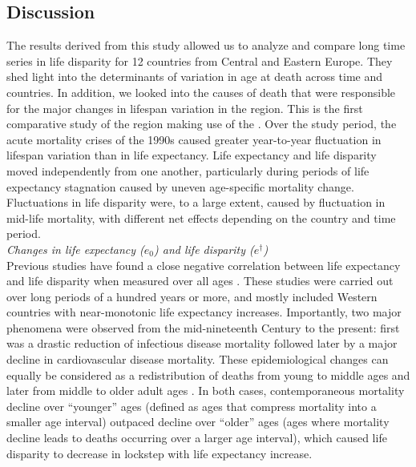 \documentclass{article}
\begin{document}
\begin{spacing}{1.5}
\section*{Discussion}

The results derived from this study allowed us to analyze and compare long time series in life disparity for 12 countries from Central and Eastern Europe. They shed light into the determinants of variation in age at death across time and countries. In addition, \textcolor[rgb]{1,0,0}{we looked into the causes of death that were responsible for the major changes in lifespan variation in the region}. This is the first comparative study of the region making use of the \citet{HcO}. Over the study period, the acute mortality crises of the 1990s caused greater year-to-year fluctuation in lifespan variation than in life expectancy. Life expectancy and life disparity moved independently from one another, particularly during periods of life expectancy stagnation caused by uneven age-specific mortality change. Fluctuations in life disparity were, to a large extent, caused by fluctuation in mid-life mortality, with different net effects depending on the country and time period. \\

 
\emph{Changes in life expectancy ($e_0$) and life disparity ($e^\dagger$)}\\

Previous studies have found a close negative correlation between life expectancy and life disparity when measured over all ages  \citep{ wilmoth1999,vaupel2011,colchero2016emergence}. These studies were carried out over long periods of a hundred years or more, and mostly included Western countries with near-monotonic life expectancy increases. Importantly, two major phenomena were observed from the mid-nineteenth Century to the present: first was a drastic reduction of infectious disease mortality followed later by a major decline in cardiovascular disease mortality. These epidemiological changes can equally be considered as a redistribution of deaths from young to middle ages and later from middle to older adult ages \citep{robine2001redefining}. In both cases, contemporaneous mortality decline over ``younger'' ages (defined as ages that compress mortality into a smaller age interval) outpaced decline over ``older'' ages (ages where mortality decline leads to deaths occurring over a larger age interval), which caused life disparity to decrease in lockstep with life expectancy increase.\\


\end{spacing}
\end{document}
